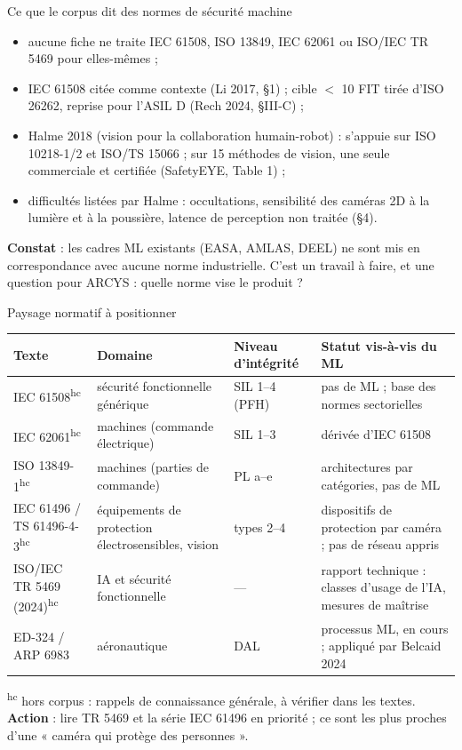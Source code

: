 \documentclass[aspectratio=169,11pt]{beamer}
\newcommand{\hc}{\textsuperscript{\color{gray}hc}}
\begin{document}
\begin{frame}{Ce que le corpus dit des normes de sécurité machine}
  \begin{itemize}
    \item aucune fiche ne traite IEC 61508, ISO 13849, IEC 62061 ou ISO/IEC TR 5469 pour
          elles-mêmes ;
    \item IEC 61508 citée comme contexte (Li 2017, §1) ; cible $<$ 10 FIT tirée
          d'ISO 26262, reprise pour l'ASIL D (Rech 2024, §III-C) ;
    \item Halme 2018 (vision pour la collaboration humain-robot) : s'appuie sur ISO 10218-1/2
          et ISO/TS 15066 ; sur 15 méthodes de vision, \alert{une seule commerciale et
          certifiée} (SafetyEYE, Table 1) ;
    \item difficultés listées par Halme : occultations, sensibilité des caméras 2D à la
          lumière et à la poussière, latence de perception non traitée (§4).
  \end{itemize}

  \vspace{0.6em}
  \textbf{Constat} : les cadres ML existants (EASA, AMLAS, DEEL) ne sont mis en
  correspondance avec aucune norme industrielle. C'est un travail à faire, et une
  question pour ARCYS : \alert{quelle norme vise le produit ?}
\end{frame}

\begin{frame}{Paysage normatif à positionner}
  \scriptsize
  \begin{tabularx}{\textwidth}{@{}p{3.3cm} p{3.4cm} p{2.2cm} L@{}}
    \toprule
    Texte & Domaine & Niveau d'intégrité & Statut vis-à-vis du ML \\
    \midrule
    IEC 61508\hc & sécurité fonctionnelle générique & SIL 1--4 (PFH) & pas de ML ; base
      des normes sectorielles \\
    IEC 62061\hc & machines (commande électrique) & SIL 1--3 & dérivée d'IEC 61508 \\
    ISO 13849-1\hc & machines (parties de commande) & PL a--e & architectures par
      catégories, pas de ML \\
    IEC 61496 / TS 61496-4-3\hc & équipements de protection électrosensibles, vision &
      types 2--4 & dispositifs de protection par caméra ; pas de réseau appris \\
    ISO/IEC TR 5469 (2024)\hc & IA et sécurité fonctionnelle & --- & rapport technique :
      classes d'usage de l'IA, mesures de maîtrise \\
    ED-324 / ARP 6983 & aéronautique & DAL & processus ML, en cours ; appliqué par
      Belcaid 2024 \\
    \bottomrule
  \end{tabularx}

  \vspace{0.3em}
  \footnotesize
  \hc{} hors corpus : rappels de connaissance générale, à vérifier dans les textes.
  \textbf{Action} : lire TR 5469 et la série IEC 61496 en priorité ; ce sont les plus proches
  d'une « caméra qui protège des personnes ».
\end{frame}
\end{document}
